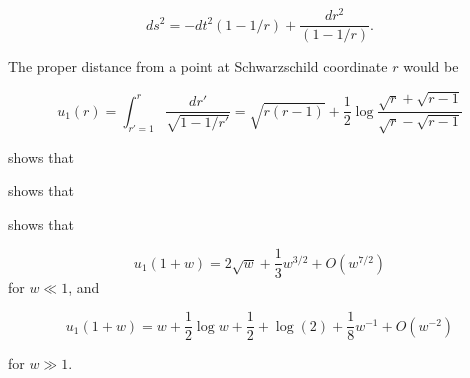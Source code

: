 \documentclass{article}
\begin{document}
\begin{equation}
  ds^2=-dt^2\left(1-1/r\right)
  +\frac{dr^2}{\left(1-1/r\right)}.
\end{equation}

The proper distance from a point at Schwarzschild coordinate $r$ would be

\begin{equation}
  u_1(r)=
  \int_{r'=1}^r\frac{dr'}{\sqrt{1-1/r'}}=
  \sqrt{r(r-1)} + \frac{1}{2}\log\frac{\sqrt{r}+\sqrt{r-1}}{\sqrt{r}-\sqrt{r-1}}
  \end{equation}

\cite{hankin2021} shows that

\citep{hankin2021} shows that

\citet{hankin2021} shows that

\cite{hankin2020}


\begin{equation}
  u_1(1+w)=2\sqrt{w} + \frac{1}{3}w^{3/2} + O(w^{7/2})
\end{equation}
for $w\ll 1$, and 

\begin{equation}
  u_1(1+w)=w + \frac{1}{2}\log w + \frac{1}{2} +
  \log(2) + \frac{1}{8}w^{-1} + O(w^{-2})
\end{equation}

for $w\gg 1$.



  
\end{document}
